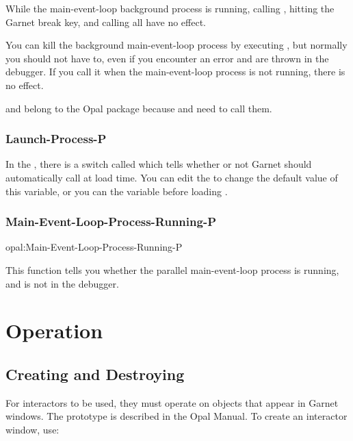 While the main-event-loop background process is running, calling
, hitting the Garnet break key, and
calling  all have no effect.

You can kill the background main-event-loop process by executing
, but normally you should not
have to, even if you encounter an error and are thrown in the debugger.
If you call it when the main-event-loop process is not running, there
is no effect.

 and 
belong to the Opal package because  and
 need to call them.


\subsection{Launch-Process-P}
In the , there is a switch called 
which tells whether or not Garnet should automatically call
 at load time.  You can edit the
 to change the default value of this variable, or you
can  the variable before loading .


\subsection{Main-Event-Loop-Process-Running-P}

\begin{programexample}
opal:Main-Event-Loop-Process-Running-P \value{function}
\end{programexample}

This function tells you whether
the parallel main-event-loop process is running, and is not in the debugger.



\chapter{Operation}
\label{detailsofOper}

\section{Creating and Destroying}
For interactors to be used, they must operate on objects that appear in
Garnet windows.  The  prototype is described
in the Opal Manual.  To create an interactor window, use:

